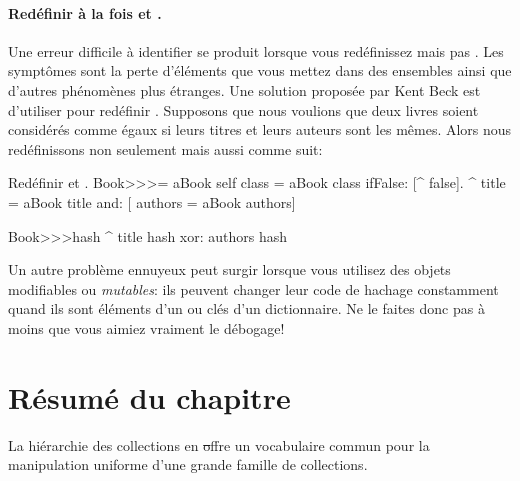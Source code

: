 \documentclass[a4paper,10pt,twoside]{book}
\begin{document}
\paragraph{Redéfinir à la fois \ct{=} et .}
Une erreur difficile à identifier se produit lorsque vous
redéfinissez \ct{=} mais pas . Les symptômes sont
la perte d'éléments que vous mettez dans des ensembles ainsi
que d'autres phénomènes plus étranges. Une solution proposée
par Kent Beck est d'utiliser  pour redéfinir .
Supposons que nous voulions que deux livres soient considérés comme
égaux si leurs titres et leurs auteurs sont les mêmes.
Alors nous redéfinissons non seulement
\ct{=} mais aussi  comme suit:

\begin{method}{Redéfinir \ct{=} et .}
Book>>>= aBook
   self class = aBook class ifFalse: [^ false].
   ^ title = aBook title and: [ authors = aBook authors]

Book>>>hash 
   ^ title hash xor: authors hash
\end{method}

Un autre problème ennuyeux peut surgir lorsque vous utilisez des
objets modifiables ou \emph{mutables}: ils peuvent changer leur
code de hachage constamment quand ils sont éléments d'un 
ou clés d'un dictionnaire. 
Ne le faites donc pas à moins que vous aimiez vraiment le débogage!

\section{Résumé du chapitre}

La hiérarchie des collections en \st offre un vocabulaire commun pour la manipulation uniforme d'une grande famille de collections.
\end{document}
